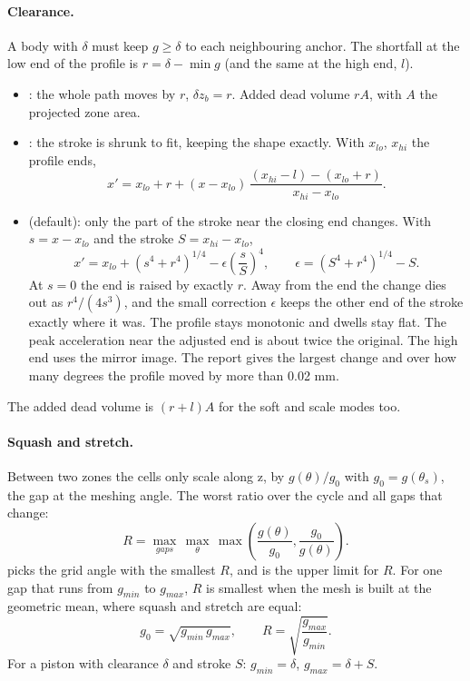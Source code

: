 \paragraph{Clearance.}
A body with  $\delta$ must keep $g \ge \delta$ to each neighbouring anchor. The shortfall at the low end of the profile is $r = \delta - \min g$ (and the same at the high end, $l$).
\begin{itemize}
    \item {}: the whole path moves by $r$, $\delta z_b = r$. Added dead volume $r A$, with $A$ the projected zone area.
    \item {}: the stroke is shrunk to fit, keeping the shape exactly. With $x_{lo}$, $x_{hi}$ the profile ends,
    \begin{equation}
    x' = x_{lo} + r + (x - x_{lo})\,\frac{(x_{hi} - l) - (x_{lo} + r)}{x_{hi} - x_{lo}} .
    \end{equation}
    \item {} (default): only the part of the stroke near the closing end changes. With $s = x - x_{lo}$ and the stroke $S = x_{hi} - x_{lo}$,
    \begin{equation}
    x' = x_{lo} + \left(s^4 + r^4\right)^{1/4} - \epsilon\left(\frac{s}{S}\right)^4, \qquad \epsilon = \left(S^4 + r^4\right)^{1/4} - S .
    \end{equation}
    At $s = 0$ the end is raised by exactly $r$. Away from the end the change dies out as $r^4/(4s^3)$, and the small correction $\epsilon$ keeps the other end of the stroke exactly where it was. The profile stays monotonic and dwells stay flat. The peak acceleration near the adjusted end is about twice the original. The high end uses the mirror image. The report gives the largest change and over how many degrees the profile moved by more than 0.02 mm.
\end{itemize}
The added dead volume is $(r + l) A$ for the soft and scale modes too.

\paragraph{Squash and stretch.}
Between two zones the cells only scale along z, by $g(\theta)/g_0$ with $g_0 = g(\theta_s)$, the gap at the meshing angle. The worst ratio over the cycle and all gaps that change:
\begin{equation}
R = \max_{gaps}\, \max_\theta\, \max\!\left(\frac{g(\theta)}{g_0}, \frac{g_0}{g(\theta)}\right) .
\end{equation}
 picks the grid angle with the smallest $R$, and  is the upper limit for $R$. For one gap that runs from $g_{min}$ to $g_{max}$, $R$ is smallest when the mesh is built at the geometric mean, where squash and stretch are equal:
\begin{equation}
g_0 = \sqrt{g_{min}\, g_{max}}, \qquad R = \sqrt{\frac{g_{max}}{g_{min}}} .
\end{equation}
For a piston with clearance $\delta$ and stroke $S$: $g_{min} = \delta$, $g_{max} = \delta + S$.

